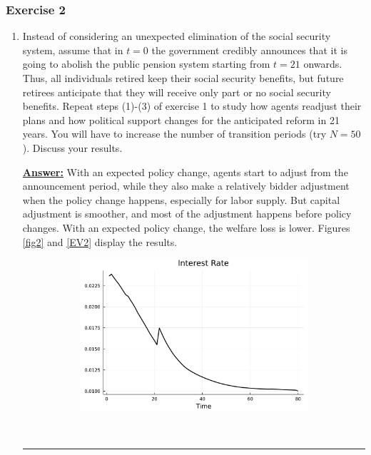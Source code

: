 \documentclass{article} %
\theoremstyle{definition}
\newenvironment{solution}[1][Answer]{\begin{singlespace}\underline{\textbf{#1:}}\quad }{\ \rule{0.3em}{0.3em}\end{singlespace}} %
\begin{document}
\subsubsection*{Exercise 2}
\begin{enumerate}
\item Instead of considering an unexpected elimination of the social security system, assume that in $ t = 0 $ the government credibly announces that it is going to abolish the public pension system starting from $ t = 21 $ onwards. Thus, all individuals retired keep their social security benefits, but future retirees anticipate that they will receive only part or no social security benefits. Repeat steps (1)-(3) of exercise 1 to study how agents readjust their plans and how political support changes for the anticipated reform in 21 years. You will have to increase the number of transition periods (try $ N = 50 $). Discuss your results.
  \begin{solution}
    With an expected policy change, agents start to adjust from the announcement period, while they also make a relatively bidder adjustment when the policy change happens, especially for labor supply. But capital adjustment is smoother, and most of the adjustment happens before policy changes.
    With an expected policy change, the welfare loss is lower. Figures \ref{fig2} and \ref{EV2} display the results.
    \begin{figure}
      \centering
      \begin{subfigure}[b]{0.475\textwidth}
        \centering
        \includegraphics[width=\textwidth]{Figures/interest_rate_ex2.pdf}
      \end{subfigure}
      \hfill
      \begin{subfigure}[b]{0.475\textwidth}  

\end{subfigure}
\end{figure}
\end{solution}
\end{enumerate}
\end{document}
